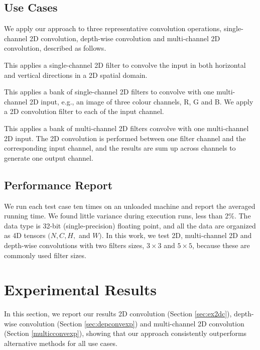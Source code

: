 \subsection{Use Cases}
We apply our approach to three representative convolution operations, single-channel 2D convolution, depth-wise convolution and
multi-channel 2D convolution, described as follows.

 This applies a single-channel 2D filter to convolve the input in both horizontal and vertical
directions in a 2D spatial domain.

 This applies a bank of single-channel 2D filters to convolve with one multi-channel 2D input, e.g., an
image of three colour channels, R, G and B. We apply a 2D convolution filter to each of the input channel.

 This applies a bank of multi-channel 2D filters convolve with one multi-channel 2D input. The 2D
convolution is performed between one filter channel and the corresponding input channel, and the results are sum up across channels to
generate one output channel.


\subsection{Performance Report} We run each test case ten times on an unloaded machine and report the averaged running time. We found
little variance during execution runs, less than 2\%.  The data type is 32-bit (single-precision) floating point, and all the data are
organized as 4D tensors $(N,C,H,$ and $W)$. In this work, we test 2D, multi-channel 2D and depth-wise convolutions with two filters sizes,
$3 \times 3$ and $5 \times 5$, because these are commonly used filter sizes.

\section{Experimental Results}
\label{exp} In this section, we report our results 2D convolution (Section \ref{sec:ex2dc}), depth-wise convolution (Section
\ref{sec:depconvexp}) and multi-channel 2D convolution (Section \ref {multicconvexp}), showing that our approach consistently outperforms
alternative methods for all use cases.


